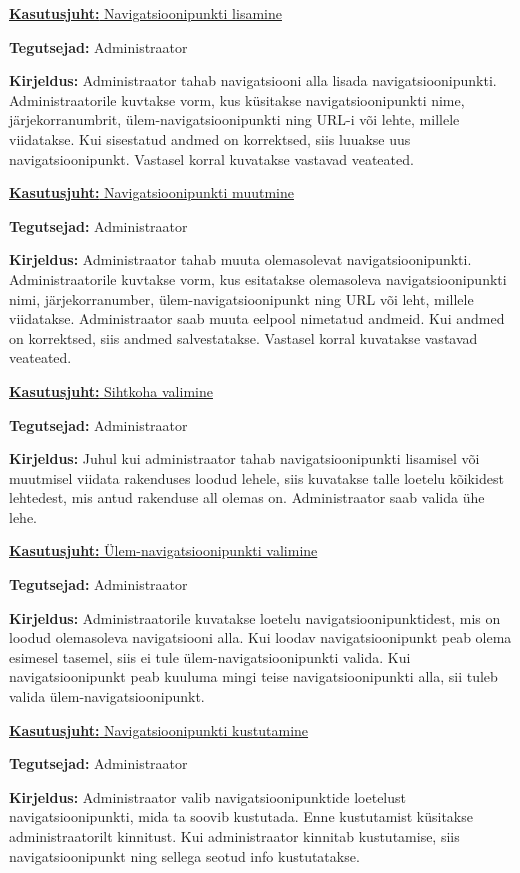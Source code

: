 \documentclass[a4paper,12pt]{article} %
\begin{document}
\underline{\textbf{Kasutusjuht:} Navigatsioonipunkti lisamine}
\par
\textbf{Tegutsejad:} Administraator
\par
\textbf{Kirjeldus:} Administraator tahab navigatsiooni alla lisada navigatsioonipunkti. Administraatorile kuvtakse vorm, kus küsitakse navigatsioonipunkti nime, järjekorranumbrit, ülem-navigatsioonipunkti ning URL-i või lehte, millele viidatakse. Kui sisestatud andmed on korrektsed, siis luuakse uus navigatsioonipunkt. Vastasel korral kuvatakse vastavad veateated.
\par

\underline{\textbf{Kasutusjuht:} Navigatsioonipunkti muutmine}
\par
\textbf{Tegutsejad:} Administraator
\par
\textbf{Kirjeldus:} Administraator tahab muuta olemasolevat navigatsioonipunkti. Administraatorile kuvtakse vorm, kus esitatakse olemasoleva navigatsioonipunkti nimi, järjekorranumber, ülem-navigatsioonipunkt ning URL või leht, millele viidatakse. Administraator saab muuta eelpool nimetatud andmeid. Kui andmed on korrektsed, siis andmed salvestatakse. Vastasel korral kuvatakse vastavad veateated.
\par

\underline{\textbf{Kasutusjuht:} Sihtkoha valimine}
\par
\textbf{Tegutsejad:} Administraator
\par
\textbf{Kirjeldus:} Juhul kui administraator tahab navigatsioonipunkti lisamisel või muutmisel viidata rakenduses loodud lehele, siis kuvatakse talle loetelu kõikidest lehtedest, mis antud rakenduse all olemas on. Administraator saab valida ühe lehe.
\par

\underline{\textbf{Kasutusjuht:} Ülem-navigatsioonipunkti valimine}
\par
\textbf{Tegutsejad:} Administraator
\par
\textbf{Kirjeldus:} Administraatorile kuvatakse loetelu navigatsioonipunktidest, mis on loodud olemasoleva navigatsiooni alla. Kui loodav navigatsioonipunkt peab olema esimesel tasemel, siis ei tule ülem-navigatsioonipunkti valida. Kui navigatsioonipunkt peab kuuluma mingi teise navigatsioonipunkti alla, sii tuleb valida ülem-navigatsioonipunkt.
\par

\underline{\textbf{Kasutusjuht:} Navigatsioonipunkti kustutamine}
\par
\textbf{Tegutsejad:} Administraator
\par
\textbf{Kirjeldus:} Administraator valib navigatsioonipunktide loetelust navigatsioonipunkti, mida ta soovib kustutada. Enne kustutamist küsitakse administraatorilt kinnitust. Kui administraator kinnitab kustutamise, siis navigatsioonipunkt ning sellega seotud info kustutatakse.
\par
\end{document}
